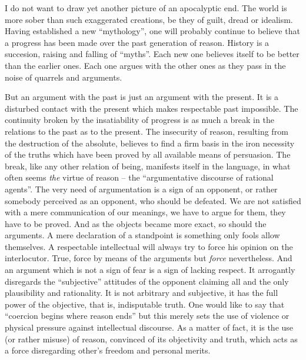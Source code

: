 I do not want to draw yet another  picture of an apocalyptic end.
The world is  more sober than such exaggerated  creations, be they of guilt, 
dread or idealism.
Having established a new ``mythology'', one will probably continue to believe
that a progress has been made over the past generation of reason. History is
a succesion, raising and falling of ``myths''. Each new one believes itself
to be better than the earlier ones. Each one argues with the other ones as
they pass in the noise of quarrels and arguments. 

But an argument with the past is just an argument with the present. It is a
disturbed contact with the present which makes respectable past impossible.
The continuity broken by the
insatiability of progress is as much a break in the relations to the past as
to the present. The insecurity of reason, resulting from the 
destruction of the absolute, believes to find a firm basis
 in the iron necessity of the truths which have been proved by all available 
means of persuasion.  The break, like any other relation of being, manifests 
itself in the language, in what often seems
{\em the} virtue of reason -- the ``argumentative discourse of rational 
agents''.
The very need of argumentation is a sign of an opponent, or rather somebody
perceived as an opponent, who should be defeated. We are not satisfied with
a mere communication of our meanings, we have to argue for them, they have to be
proved. And as the objects became more exact, so should the arguments. 
A mere declaration of a standpoint is something only fools allow themselves. A
respectable intellectual will always try to force his opinion on the 
interlocutor. True, force by means of the arguments but {\em force} 
nevertheless. And an argument which is not a sign of fear is a sign of lacking 
respect. It arrogantly disregards the ``subjective'' attitudes of the opponent
claiming all and the only  plausibility and rationality. It is not arbitrary and 
subjective, it has
the full power of the objective, that is, indisputable truth. One would like
to say that ``coercion begins where reason ends'' but this merely sets the use
of violence or physical pressure against intellectual discourse. As a matter
of fact, it is the use (or rather misuse) of reason, convinced of its 
objectivity and truth, which acts as a force disregarding other's freedom and 
personal merits.


